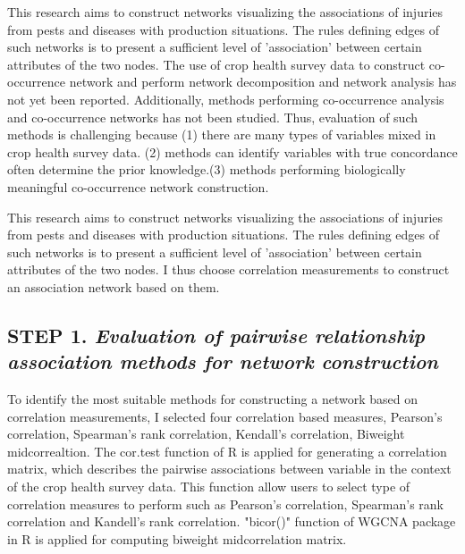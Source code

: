 This research aims to construct networks visualizing the associations of injuries from pests and diseases with production situations. The rules defining edges of such networks is to present a sufficient level of 'association' between certain attributes of the two nodes. The use of crop health survey data to construct co-occurrence network and perform network decomposition and network analysis has not yet been reported. Additionally, methods performing co-occurrence analysis and co-occurrence networks has not been studied. Thus, evaluation of such methods is challenging because (1) there are many types of variables mixed in crop health survey data. (2) methods can identify variables with true concordance often determine the prior knowledge.(3) methods performing biologically meaningful co-occurrence network construction. 

This research aims to construct networks visualizing the associations of injuries from pests and diseases with production situations. The rules defining edges of such networks is to present a sufficient level of 'association' between certain attributes of the two nodes. I thus choose correlation measurements to construct an association network based on them.


\subsection*{\textbf{STEP 1. }\textit{Evaluation of pairwise relationship association methods for network construction}}



To identify the most suitable methods for constructing a network based on correlation measurements, I selected four correlation based measures, Pearson's correlation, Spearman's rank correlation, Kendall's correlation, Biweight midcorrealtion. The cor.test function of R  is applied for generating a correlation matrix, which describes the pairwise associations between variable in the context of the crop health survey data. This function allow users to select type of correlation measures to perform such as Pearson's correlation, Spearman's rank correlation and Kandell's rank correlation. "bicor()" function of WGCNA package  in R is applied for computing biweight midcorrelation matrix. 


